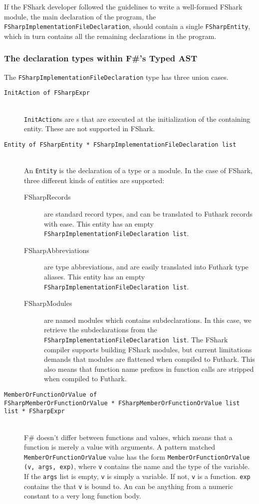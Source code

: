 If the FShark developer followed the guidelines to write a well-formed FShark
module, the main declaration of the program, the
\texttt{FSharpImplementationFileDeclaration}, should contain a single
\texttt{FSharpEntity}, which in turn contains all the remaining declarations in
the program.

\subsubsection{The declaration types within F\#'s Typed AST}
The \texttt{FSharpImplementationFileDeclaration} type has three union cases.
\begin{description}
\item[\texttt{InitAction of FSharpExpr}] \hfill\\
  \texttt{InitAction}s are \fsharpexpr{}s that are executed at the
  initialization of the containing entity. These are not supported in FShark.

\item[\texttt{Entity of FSharpEntity * FSharpImplementationFileDeclaration list}]\hfill\\
  An \texttt{Entity} is the declaration of a type or a module. In the case of
  FShark, three different kinds of entities are supported:
  \begin{description}
  \item[FSharpRecords] are standard record types, and can be translated to
    Futhark records with ease.
    This entity has an empty \texttt{FSharpImplementationFileDeclaration list}.
  \item[FSharpAbbreviations] are type abbreviations, and are easily translated
    into Futhark type aliases.
    This entity has an empty \texttt{FSharpImplementationFileDeclaration list}.
  \item[FSharpModules] are named modules which contains subdeclarations.
    In this case, we retrieve the subdeclarations from the \texttt{FSharpImplementationFileDeclaration list}.
    The FShark compiler supports building FShark modules, but current
    limitations demands that modules are flattened when compiled to Futhark.
    This also means that function name prefixes in function calls are stripped
    when compiled to Futhark.
  \end{description}
\item[\texttt{MemberOrFunctionOrValue of \\ FSharpMemberOrFunctionOrValue *
    FSharpMemberOrFunctionOrValue list list * FSharpExpr}]\hfill\\
  F\# doesn't differ between functions and values, which means that a function
  is merely a value with arguments.
  A pattern matched \texttt{MemberOrFunctionOrValue} value has the form
  \texttt{MemberOrFunctionOrValue (v, args, exp)}, where \texttt{v} contains the
  name and the type of the variable.
  If the \texttt{args} list is empty, \texttt{v} is simply a variable. If not,
  \texttt{v} is a function. \texttt{exp} contains the \fsharpexpr{} that
  \texttt{v} is bound to. An \fsharpexpr{} can be anything from a numeric
  constant to a very long function body.
\end{description}

